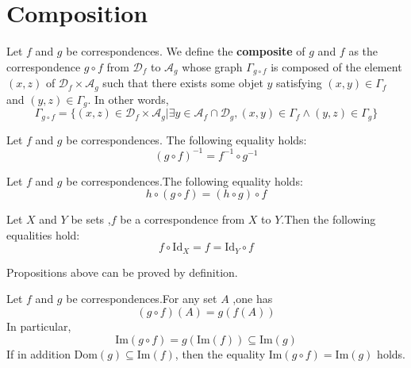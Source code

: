 \documentclass{book}
\numberwithin{equation}{section}
\begin{document}
\section{Composition}
\begin{definitionenv}
    Let $f$ and $g$ be correspondences. We define the \textbf{composite } of $g$ and $f$ as the correspondence $g\circ f$ from $\mathscr{D}_f$  to $\mathscr{A}_g$ whose graph $\Gamma_{g\circ f }$ is composed of the element $(x,z)$ of $\mathscr{D}_f\times \mathscr{A}_g$ such that there exists some objet $y$ satisfying $(x,y)\in \Gamma_f $ and $(y,z)\in \Gamma_g$. In other words,
    $$\Gamma_{g\circ f }=\{(x,z)\in \mathscr{D}_f\times \mathscr{A}_g|\exists y\in \mathscr{A}_f\cap\mathscr{D}_g,(x,y)\in \Gamma_f \wedge (y,z)\in \Gamma_g\}$$
\end{definitionenv}
\begin{propositionenv}
    Let $f$ and $g$ be correspondences. The following equality holds:
    \begin{equation}
        (g\circ f)^{-1}=f^{-1}\circ g^{-1}
    \end{equation}
\end{propositionenv}
\begin{propositionenv}\label{proposition3.4.2}
    Let $f$ and $g$ be correspondences.The following equality holds:
    \begin{equation}
        h\circ (g\circ f)=(h\circ g)\circ f
    \end{equation}
\end{propositionenv}
\begin{propositionenv}\label{proposition3.4.3}
    Let $X$ and $Y$ be sets ,$f$ be a correspondence from $X$ to $Y$.Then the following equalities hold:
    $$f\circ \mathrm{Id}_X=f=\mathrm{Id}_Y\circ f$$
\end{propositionenv}
Propositions above can be proved by definition.
\begin{propositionenv}\label{proposition3.4.4}
    Let $f$ and $g$ be correspondences.For any set $A$ ,one has 
    $$(g\circ f)(A)=g(f(A))$$
    In particular,
    $$\mathrm{Im}(g\circ f)=g(\mathrm{Im}(f))\subseteq \mathrm{Im}(g)$$
    If in addition $\mathrm{Dom}(g)\subseteq \mathrm{Im}(f)$, then the equality $\mathrm{Im}(g\circ f)=\mathrm{Im}(g)$ holds.
\end{propositionenv}
\end{document}
